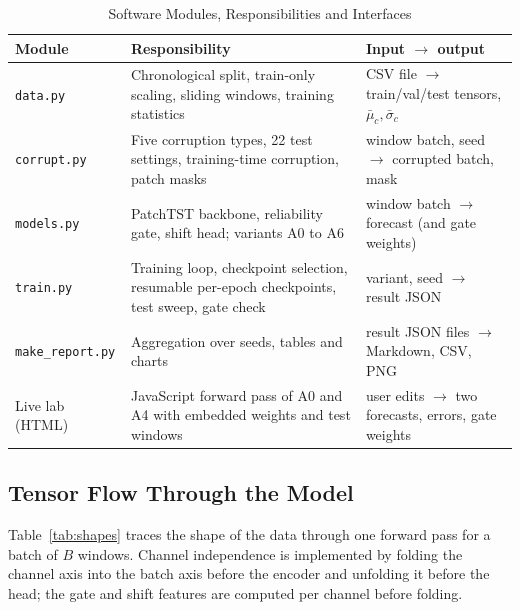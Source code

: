 \begin{table}[!t]
\centering
\caption{Software Modules, Responsibilities and Interfaces}
\label{tab:modules}
\footnotesize
\renewcommand{\arraystretch}{1.15}
\begin{tabular}{@{}p{}p{}p{}@{}}
\toprule
Module & Responsibility & Input $\rightarrow$ output \\
\midrule
\texttt{data.py} & Chronological split, train-only scaling, sliding windows, training statistics & CSV file $\rightarrow$ train/val/test tensors, $\bar{\mu}_c,\bar{\sigma}_c$ \\
\texttt{corrupt.py} & Five corruption types, 22 test settings, training-time corruption, patch masks & window batch, seed $\rightarrow$ corrupted batch, mask \\
\texttt{models.py} & PatchTST backbone, reliability gate, shift head; variants A0 to A6 & window batch $\rightarrow$ forecast (and gate weights) \\
\texttt{train.py} & Training loop, checkpoint selection, resumable per-epoch checkpoints, test sweep, gate check & variant, seed $\rightarrow$ result JSON \\
\texttt{make\_report.py} & Aggregation over seeds, tables and charts & result JSON files $\rightarrow$ Markdown, CSV, PNG \\
Live lab (HTML) & JavaScript forward pass of A0 and A4 with embedded weights and test windows & user edits $\rightarrow$ two forecasts, errors, gate weights \\
\bottomrule
\end{tabular}
\end{table}

\subsection{Tensor Flow Through the Model}

Table~\ref{tab:shapes} traces the shape of the data through one forward pass for a batch of $B$ windows. Channel independence is implemented by folding the channel axis into the batch axis before the encoder and unfolding it before the head; the gate and shift features are computed per channel before folding.

